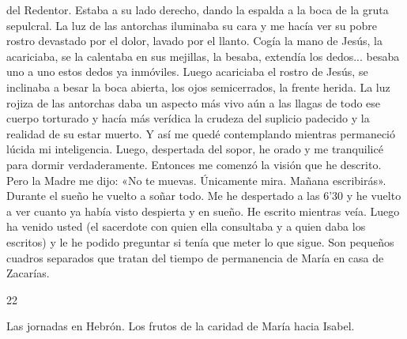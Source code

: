 \documentclass[12pt]{book} %
\begin{document}
del Redentor. Estaba a su lado derecho, dando la espalda a la boca de la gruta sepulcral. La luz de las antorchas iluminaba su cara y me hacía ver su pobre rostro devastado por el dolor, lavado por el llanto. Cogía la mano de Jesús, la acariciaba, se la calentaba en sus mejillas, la besaba, extendía los dedos... besaba uno a uno estos dedos ya inmóviles. Luego acariciaba el rostro de Jesús, se inclinaba a besar la boca abierta, los ojos semicerrados, la frente herida. La luz rojiza de las antorchas daba un aspecto más vivo aún a las llagas de todo ese cuerpo torturado y hacía más verídica la crudeza del suplicio padecido y la realidad de su estar muerto. 
Y así me quedé contemplando mientras permaneció lúcida mi inteligencia. Luego, despertada del sopor, he orado y me tranquilicé para dormir verdaderamente. Entonces me comenzó la visión que he descrito. Pero la Madre me dijo: «No te muevas. Únicamente mira. Mañana escribirás». Durante el sueño he vuelto a soñar todo. Me he despertado a las 6'30 y he vuelto a ver cuanto ya había visto despierta y en sueño. He escrito mientras veía. Luego ha venido usted (el sacerdote con quien ella consultaba y a quien daba los escritos) y le he podido preguntar si tenía que meter lo que sigue. Son pequeños cuadros separados que tratan del tiempo de permanencia de María en casa de Zacarías. 
 
22 
 
Las jornadas en Hebrón. Los frutos de la caridad de María hacia Isabel. 
 
\end{document}
